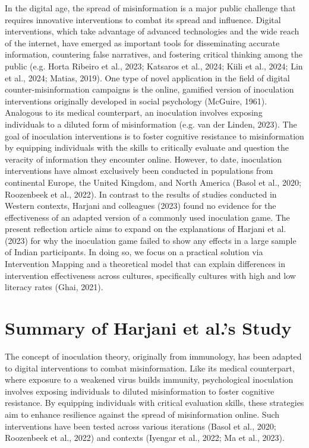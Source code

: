 \documentclass[authordate, empirical]{jote-new-article}
\begin{document}
	In the digital age, the spread of misinformation is a major public challenge that requires innovative interventions to combat its spread and influence. Digital interventions, which take advantage of advanced technologies and the wide reach of the internet, have emerged as important tools for disseminating accurate information, countering false narratives, and fostering critical thinking among the public (e.g. Horta Ribeiro et al., 2023; Katsaros et al., 2024; Kiili et al., 2024; Lin et al., 2024; Matias, 2019). One type of novel application in the field of digital counter-misinformation campaigns is the online, gamified version of inoculation interventions originally developed in social psychology (McGuire, 1961). Analogous to its medical counterpart, an inoculation involves exposing individuals to a diluted form of misinformation (e.g. van der Linden, 2023). The goal of inoculation interventions is to foster cognitive resistance to misinformation by equipping individuals with the skills to critically evaluate and question the veracity of information they encounter online. However, to date, inoculation interventions have almost exclusively been conducted in populations from continental Europe, the United Kingdom, and North America (Basol et al., 2020; Roozenbeek et al., 2022). In contrast to the results of studies conducted in Western contexts, Harjani and colleagues (2023) found no evidence for the effectiveness of an adapted version of a commonly used inoculation game. The present reflection article aims to expand on the explanations of Harjani et al. (2023) for why the inoculation game failed to show any effects in a large sample of Indian participants. In doing so, we focus on a practical solution via Intervention Mapping and a theoretical model that can explain differences in intervention effectiveness across cultures, specifically cultures with high and low literacy rates (Ghai, 2021).



	\section{Summary of Harjani et al.'s Study}



	The concept of inoculation theory, originally from immunology, has been adapted to digital interventions to combat misinformation. Like its medical counterpart, where exposure to a weakened virus builds immunity, psychological inoculation involves exposing individuals to diluted misinformation to foster cognitive resistance. By equipping individuals with critical evaluation skills, these strategies aim to enhance resilience against the spread of misinformation online. Such interventions have been tested across various iterations (Basol et al., 2020; Roozenbeek et al., 2022) and contexts (Iyengar et al., 2022; Ma et al., 2023).
\end{document}
